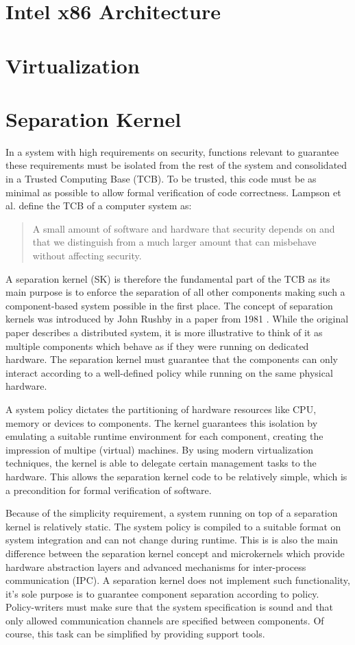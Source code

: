 \section{Intel x86 Architecture}
\section{Virtualization}
\section{Separation Kernel}
In a system with high requirements on security, functions relevant
to guarantee these requirements must be isolated from the rest of
the system and consolidated in a Trusted Computing Base (TCB).
To be trusted, this code must be as minimal as possible to allow formal
verification of code correctness. Lampson et al.
\cite{Lampson:1991:ADS:121133.121160} define the TCB of a computer system as:
\begin{quote}
	A small amount of software and hardware that security depends on and
	that we distinguish from a much larger amount that can misbehave without
	affecting security.
\end{quote}

A separation kernel (SK) is therefore the fundamental
part of the TCB as its main purpose is to enforce the separation of all other
components making such a component-based system possible in the first place. The
concept of separation kernels was introduced by John Rushby in a paper from 1981
\cite{rushby1981}. While the original paper describes a distributed system, it
is more illustrative to think of it as multiple components which behave as if
they were running on dedicated hardware. The separation kernel must guarantee
that the components can only interact according to a well-defined policy while
running on the same physical hardware.

A system policy dictates the partitioning of hardware resources like CPU, memory
or devices to components. The kernel guarantees this isolation by emulating a
suitable runtime environment for each component, creating the impression of
multipe (virtual) machines. By using modern virtualization techniques, the
kernel is able to delegate certain management tasks to the hardware. This allows
the separation kernel code to be relatively simple, which is a precondition for
formal verification of software.

Because of the simplicity requirement, a system running on top of a separation
kernel is relatively static. The system policy is compiled to a suitable format
on system integration and can not change during runtime. This is is also the
main difference between the separation kernel concept and microkernels which
provide hardware abstraction layers and advanced mechanisms for inter-process
communication (IPC). A separation kernel does not implement such
functionality, it's sole purpose is to guarantee component separation according
to policy. Policy-writers must make sure that the system specification is sound
and that only allowed communication channels are specified between components.
Of course, this task can be simplified by providing support tools.

